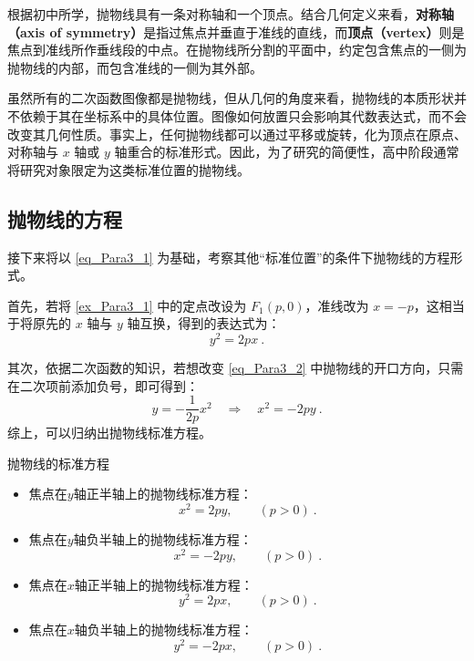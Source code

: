 根据初中所学，抛物线具有一条对称轴和一个顶点。结合几何定义来看，\textbf{对称轴（axis of symmetry）}是指过焦点并垂直于准线的直线，而\textbf{顶点（vertex）}则是焦点到准线所作垂线段的中点。在抛物线所分割的平面中，约定包含焦点的一侧为抛物线的内部，而包含准线的一侧为其外部。

虽然所有的二次函数图像都是抛物线，但从几何的角度来看，抛物线的本质形状并不依赖于其在坐标系中的具体位置。图像如何放置只会影响其代数表达式，而不会改变其几何性质。事实上，任何抛物线都可以通过平移或旋转，化为顶点在原点、对称轴与 $x$ 轴或 $y$ 轴重合的标准形式。因此，为了研究的简便性，高中阶段通常将研究对象限定为这类标准位置的抛物线。

\subsection{抛物线的方程}

接下来将以 \autoref{eq_Para3_1} 为基础，考察其他“标准位置”的条件下抛物线的方程形式。

首先，若将 \autoref{ex_Para3_1} 中的定点改设为 $F_1(p,0)$，准线改为 $x = -p$，这相当于将原先的 $x$ 轴与 $y$ 轴互换，得到的表达式为：
\begin{equation}\label{eq_Para3_5}
y^2 = 2px~.
\end{equation}

其次，依据二次函数的知识，若想改变 \autoref{eq_Para3_2} 中抛物线的开口方向，只需在二次项前添加负号，即可得到：
\begin{equation}
y = -\frac{1}{2p}x^2 \quad \Longrightarrow \quad x^2 = -2py~.
\end{equation}
综上，可以归纳出抛物线标准方程。

\begin{theorem}{抛物线的标准方程}\label{the_Para3_1}
\begin{itemize}
\item 焦点在$y$轴正半轴上的抛物线标准方程：
\begin{equation}
x^2=2py,\qquad(p>0)~.
\end{equation}
\item 焦点在$y$轴负半轴上的抛物线标准方程：
\begin{equation}
x^2=-2py,\qquad(p>0)~.
\end{equation}
\item 焦点在$x$轴正半轴上的抛物线标准方程：
\begin{equation}\label{eq_Para3_3}
y^2=2px,\qquad(p>0)~.
\end{equation}
\item 焦点在$x$轴负半轴上的抛物线标准方程：
\begin{equation}
y^2=-2px,\qquad(p>0)~.
\end{equation}
\end{itemize}
\end{theorem}

